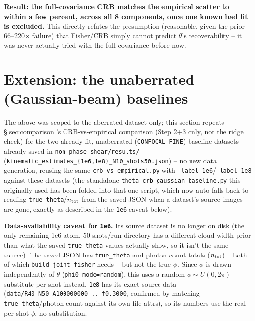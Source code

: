 \documentclass[11pt,a4paper]{article}
\newcommand{\code}[1]{\texttt{#1}}
\begin{document}
\textbf{Result: the full-covariance CRB matches the empirical scatter to
within a few percent, across all 8 components, once one known bad fit is
excluded.} This directly refutes the presumption (reasonable, given the
prior 66--220$\times$ failure) that Fisher/CRB simply cannot predict
$\theta$'s recoverability -- it was never actually tried with the full
covariance before now.

\section{Extension: the unaberrated (Gaussian-beam) baselines}
\label{sec:baseline}

The above was scoped to the aberrated dataset only; this section repeats
\S\ref{sec:comparison}'s CRB-vs-empirical comparison (Step 2+3 only, not the
ridge check) for the two already-fit, unaberrated (\code{CONFOCAL\_FINE})
baseline datasets already saved in \code{non\_phase\_shear/results/}
(\code{kinematic\_estimates\_\{1e6,1e8\}\_N10\_shots50.json}) -- no new data
generation, reusing the same \code{crb\_vs\_empirical.py} with
\code{--label 1e6}/\code{--label 1e8} against these datasets (the standalone
\code{theta\_crb\_gaussian\_baseline.py} this originally used has been
folded into that one script, which now auto-falls-back to reading
\code{true\_theta}/$n_{\rm tot}$ from the saved JSON when a dataset's source
images are gone, exactly as described in the \code{1e6} caveat below).

\textbf{Data-availability caveat for \code{1e6}.} Its source dataset is no
longer on disk (the only remaining 1e6-atom, 50-shots/run directory has a
different cloud-width prior than what the saved \code{true\_theta} values
actually show, so it isn't the same source). The saved JSON has
\code{true\_theta} and photon-count totals ($n_{\rm tot}$) -- both of which
\code{build\_joint\_fisher} needs -- but not the true $\phi$. Since $\phi$
is drawn independently of $\theta$ (\code{phi0\_mode=random}), this uses a
random $\phi\sim U(0,2\pi)$ substitute per shot instead. \code{1e8} has its
exact source data (\code{data/R40\_N50\_A100000000\_..\_f0.3000}, confirmed
by matching \code{true\_theta}/photon-count against its own file attrs), so
its numbers use the real per-shot $\phi$, no substitution.
\end{document}
